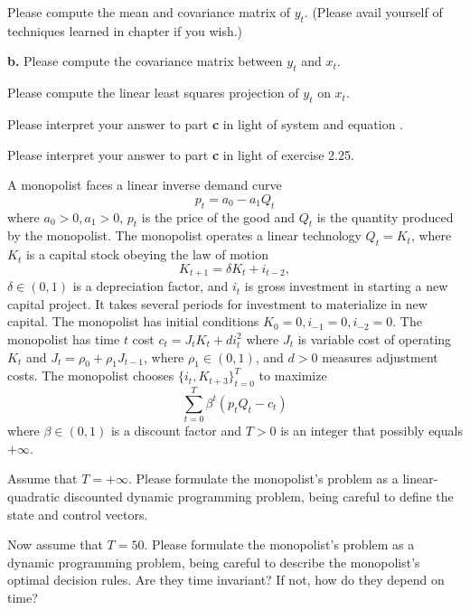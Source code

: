 \medskip
{} Please compute the mean and covariance matrix of $y_t$. (Please avail yourself of techniques learned in chapter 
if you wish.)

\medskip
\noindent
{\bf b.} Please compute the covariance matrix between $y_t$ and $x_t$.

\medskip
{} Please compute the linear least squares projection of $y_t$ on $x_t$.

\medskip
{} Please interpret your answer to part {\bf c}  in light of system  and equation .

\medskip
{} Please interpret your answer to part {\bf c}  in light of exercise 2.25.


\medskip
{} 
\medskip
\noindent
A monopolist faces a linear inverse demand curve
$$ p_t = a_0 - a_1 Q_t $$
where $a_0 > 0, a_1 >0$, $p_t$ is the price of the good and $Q_t$ is the quantity produced by the monopolist.
The monopolist operates a linear technology $Q_t = K_t$, where $K_t$ is a capital stock obeying the law of motion
$$ K_{t+1} = \delta K_t + i_{t-2}, $$
 $\delta \in (0,1)$ is a depreciation factor, and $i_t$ is gross investment in starting a  new capital project. It takes several periods
 for investment to materialize in new capital.  The monopolist
has initial conditions $K_0 = 0, i_{-1} = 0, i_{-2} =0$.  The monopolist has time $t$ cost
$c_t = J_t K_t + d i_t^2$ where $J_t$ is variable cost of operating $K_t$ and $J_t = \rho_0 + \rho_1 J_{t-1}$, where $\rho_1 \in (0,1)$, and
$d >0$ measures adjustment costs. The monopolist chooses $\{i_t, K_{t+3}\}_{t=0}^T$ to maximize
$$ \sum_{t=0}^T \beta^t \left( p_t Q_t - c_t \right) $$
where $\beta \in (0,1)$ is a discount factor and $T>0$ is an integer that possibly equals $+ \infty$.

\medskip
{} Assume that $T = +\infty$.  Please formulate the monopolist's problem as a linear-quadratic discounted dynamic programming problem, being careful to define
the state and control vectors.

\medskip
{}  Now assume that $T= 50$.  Please formulate the monopolist's problem as a dynamic programming problem, being careful
  to describe the monopolist's optimal decision rules.  Are they time invariant? If not, how do they depend on time?


\medskip
{} 
\medskip

